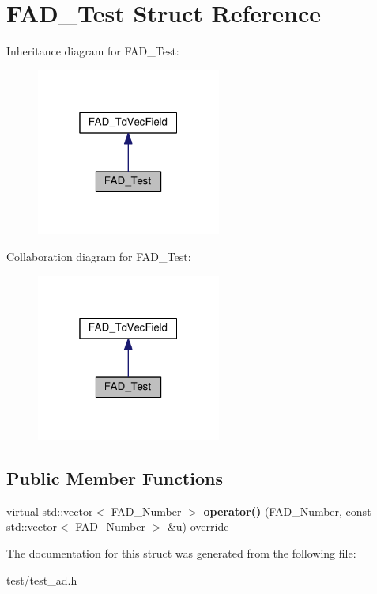 \hypertarget{structFAD__Test}{}\section{F\+A\+D\+\_\+\+Test Struct Reference}
\label{structFAD__Test}


Inheritance diagram for F\+A\+D\+\_\+\+Test\+:\nopagebreak
\begin{figure}[H]
\begin{center}
\leavevmode
\includegraphics[width=172pt]{structFAD__Test__inherit__graph}
\end{center}
\end{figure}


Collaboration diagram for F\+A\+D\+\_\+\+Test\+:\nopagebreak
\begin{figure}[H]
\begin{center}
\leavevmode
\includegraphics[width=172pt]{structFAD__Test__coll__graph}
\end{center}
\end{figure}
\subsection*{Public Member Functions}
\begin{DoxyCompactItemize}
\item 
\mbox{\label{structFAD__Test_a3b11ac80b4a6dc1cc232865d68f740ad}} 
virtual std\+::vector$<$ F\+A\+D\+\_\+\+Number $>$ {\bfseries operator()} (F\+A\+D\+\_\+\+Number, const std\+::vector$<$ F\+A\+D\+\_\+\+Number $>$ \&u) override
\end{DoxyCompactItemize}


The documentation for this struct was generated from the following file\+:\begin{DoxyCompactItemize}
\item 
test/test\+\_\+ad.\+h\end{DoxyCompactItemize}
